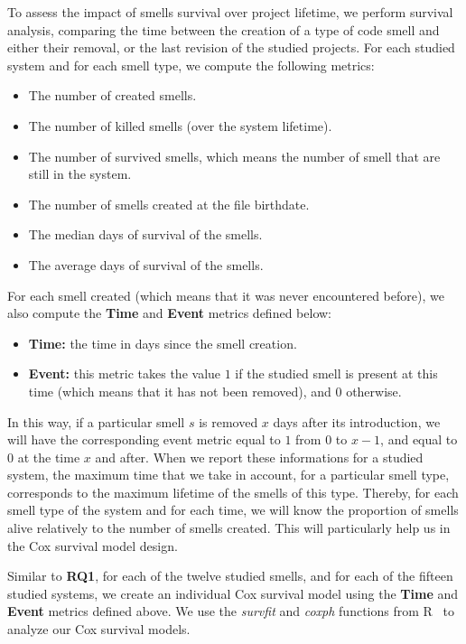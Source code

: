 \documentclass[smallcondensed]{svjour3}
\begin{document}
{To assess the impact of smells survival over project lifetime, we perform survival analysis, comparing the time between the creation of a type of code smell and either their removal, or the last revision of the studied projects. %
For each studied system and for each smell type, we compute the following metrics:
\begin{itemize}
	\item The number of created smells.
	\item The number of killed smells (over the system lifetime).
	\item The number of survived smells, which means the number of smell that are still in the system.
	\item The number of smells created at the file birthdate.
	\item The median days of survival of the smells.
	\item The average days of survival of the smells.
\end{itemize}
For each smell created (which means that it was never encountered before), we also compute the \textbf{Time} and \textbf{Event} metrics defined below:
\begin{itemize}
	\item \textbf{Time:} the time in days since the smell creation.
	\item \textbf{Event:} this metric takes the value $1$ if the studied smell is present at this time (which means that it has not been removed), and $0$ otherwise.
\end{itemize}
In this way, if a particular smell $s$ is removed $x$ days after its introduction, we will have the corresponding event metric equal to $1$ from $0$ to $x-1$, and equal to $0$ at the time $x$ and after. When we report these informations for a studied system, the maximum time that we take in account, for a particular smell type, corresponds to the maximum lifetime of the smells of this type. Thereby, for each smell type of the system and for each time, we will know the proportion of smells alive relatively to the number of smells created. This will particularly help us in the Cox survival model design.

Similar to \textbf{RQ1}, for each of the twelve studied smells, and for each of the fifteen studied systems, we create an individual Cox survival model using the \textbf{Time} and \textbf{Event} metrics defined above. We use the \textsl{survfit} and \textsl{coxph} functions from R~\cite{rPackage} to analyze our Cox survival models.}
\end{document}
